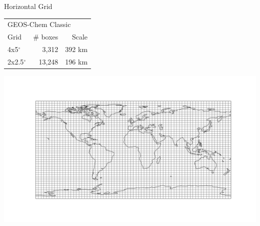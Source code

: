 \documentclass[10pt]{beamer}
\begin{document}
\begin{frame}[fragile]{Horizontal Grid}
    \small
    \begin{minipage}[c]{0.5\textwidth}
        \begin{table}[]
        \begin{tabular}{lrr}
            \hline
            \multicolumn{3}{l}{GEOS-Chem Classic} \\ 
            Grid & \# boxes & Scale \\ 
            \hline
            4x5$^{\circ}$ & 3,312 & 392 km \\ 
            2x2.5$^{\circ}$ & 13,248 & 196 km \\ 
            \hline
        \end{tabular}
        \end{table}
    \end{minipage}
    \begin{minipage}[c]{0.49\textwidth}
        \includegraphics[height=0.4\textheight]{hgrid_4x5.png}
    \end{minipage}


\end{frame}
\end{document}
